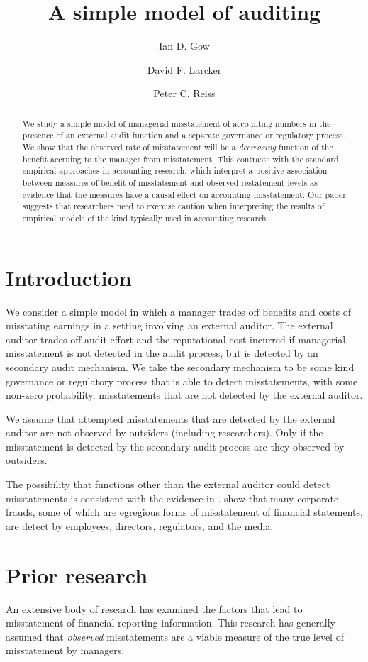 \documentclass[11pt]{amsart}
\title[Audit model]{A simple model of auditing}
\author{Ian D. Gow \and David F. Larcker \and Peter C. Reiss}
\begin{document}
\maketitle

\begin{abstract}
We study a simple model of managerial misstatement of accounting numbers in the presence of an external audit function and a separate governance or regulatory process. We show that the observed rate of misstatement will be a \emph{decreasing} function of the benefit accruing to the manager from misstatement. This contrasts with the standard empirical approaches in accounting research, which interpret a positive association between measures of benefit of misstatement and observed restatement levels as evidence that the measures have a causal effect on accounting misstatement. Our paper suggests that researchers need to exercise caution when interpreting the results of empirical models of the kind typically used in accounting research. 
\end{abstract}


\section{Introduction}
We consider a simple model in which a manager trades off benefits and costs of misstating earnings in a setting involving an external auditor. The external auditor trades off audit effort and the reputational cost incurred if managerial misstatement is not detected in the audit process, but is detected by an secondary audit mechanism. We take the secondary mechanism to be some kind governance or regulatory process that is able to detect misstatements, with some non-zero probability, misstatements that are not detected by the external auditor.

We assume that attempted misstatements that are detected by the external auditor are not observed by outsiders (including researchers). Only if the misstatement is detected by the secondary audit process are they observed by outsiders.

The possibility that functions other than the external auditor could detect misstatements is consistent with the evidence in \citet{Dyck:2010kh}. \citet{Dyck:2010kh} show that many corporate frauds, some of which are egregious forms of misstatement of financial statements, are detect by employees, directors, regulators, and the media.

\section{Prior research}
An extensive body of research has examined the factors that lead to misstatement of financial reporting information. This research has generally assumed that \emph{observed} misstatements are a viable measure of the true level of misstatement by managers.
\end{document}
